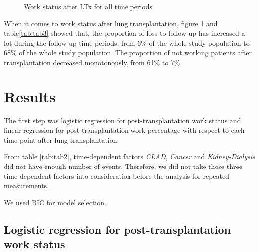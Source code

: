 \documentclass[11pt, a4paper]{article}\usepackage[]{graphicx}\usepackage[]{color}
\newenvironment{knitrout}{}{} %
\begin{document}
{\begin{figure}[ht]
\begin{knitrout}
\end{knitrout}
\caption{Work status after LTx for all time periods}\label{fig:fig8}
\end{figure}


\begin{table}[ht]
\centering
\caption{Post-LTx work status} 
\label{tab:tab3}
\end{table}


When it comes to work status after lung transplantation, figure \ref {fig:fig8} and table\ref{tab:tab3} showed that, the proportion of loss to follow-up has increased a lot during the follow-up time periods, from 6\% of the whole study population to 68\% of the whole study population. The proportion of  not working patients after transplantation decreased monotonously, from 61\% to 7\%.

\clearpage
\section{Results} \label{sec:results}
The first step was logistic regression for post-transplantation work status and linear regression for post-transplantation work percentage with respect to each time point after lung transplantation.

From table \ref{tab:tab2}, time-dependent factors \textit{CLAD}, \textit{Cancer} and \textit{Kidney-Dialysis} did not have enough number of events. Therefore, we did not take those three time-dependent factors into consideration before the analysis for repeated measurements.

We used BIC for model selection. 

\subsection*{Logistic regression for post-transplantation work status} \label{subsec:logis}
}
\end{document}
